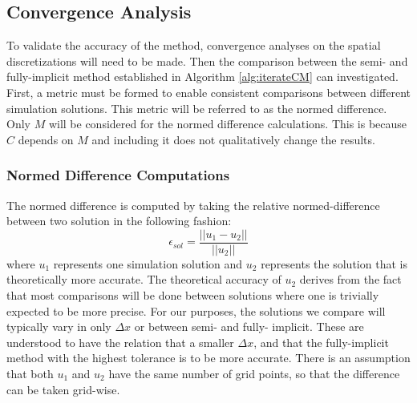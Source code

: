 
\subsection{Convergence Analysis}
  To validate the accuracy of the method, convergence analyses on the spatial discretizations will need to be made. 
  Then the comparison between the semi- and fully-implicit method established in Algorithm \ref{alg:iterateCM} can investigated.
  First, a metric must be formed to enable consistent comparisons between different simulation solutions. 
  This metric will be referred to as the normed difference. 
  Only $M$ will be considered for the normed difference calculations.
  This is because $C$ depends on $M$ and including it does not qualitatively change the results.

\subsubsection{Normed Difference Computations}

  The normed difference is computed by taking the relative normed-difference between two solution in the following fashion:
  \begin{equation} \label{equ:normed difference_comp}
    \epsilon_{sol} = \frac{||u_1 - u_2||}{||u_2||}
  \end{equation}
  where $u_1$ represents one simulation solution and $u_2$ represents the solution that is theoretically more accurate.
  The theoretical accuracy of $u_2$ derives from the fact that most comparisons will be done between solutions where one is trivially expected to be more precise.
  For our purposes, the solutions we compare will typically vary in only $\Delta x$ or between semi- and fully- implicit.
  These are understood to have the relation that a smaller $\Delta x$, and that the fully-implicit method with the highest tolerance is to be more accurate.
  There is an assumption that both $u_1$ and $u_2$ have the same number of grid points, so that the difference can be taken grid-wise.

